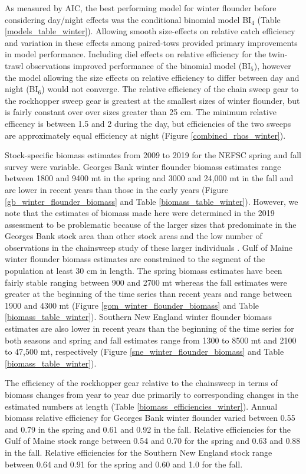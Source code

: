 \documentclass[]{article}
\begin{document}
As measured by AIC, the best performing model for winter flounder before
considering day/night effects was the conditional binomial model
BI\(_4\) (Table \ref{models_table_winter}). Allowing smooth size-effects
on relative catch efficiency and variation in these effects among
paired-tows provided primary improvements in model performance.
Including diel effects on relative efficiency for the twin-trawl
observations improved performance of the binomial model (BI\(_5\)),
however the model allowing the size effects on relative efficiency to
differ between day and night (BI\(_6\)) would not converge. The relative
efficiency of the chain sweep gear to the rockhopper sweep gear is
greatest at the smallest sizes of winter flounder, but is fairly
constant over over sizes greater than 25 cm. The minimum relative
efficency is between 1.5 and 2 during the day, but efficiencies of the
two sweeps are approximately equal efficiency at night (Figure
\ref{combined_rhos_winter}).

Stock-specific biomass estimates from 2009 to 2019 for the NEFSC spring
and fall survey were variable. Georges Bank winter flounder biomass
estimates range between 1800 and 9400 mt in the spring and 3000 and
24,000 mt in the fall and are lower in recent years than those in the
early years (Figure \ref{gb_winter_flounder_biomass} and Table
\ref{biomass_table_winter}). However, we note that the estimates of
biomass made here were determined in the 2019 assessment to be
problematic because of the larger sizes that predominate in the Georges
Bank stock area than other stock areas and the low number of
observations in the chainsweep study of these larger individuals
\citep{nefsc2020}. Gulf of Maine winter flounder biomass estimates are
constrained to the segment of the population at least 30 cm in length.
The spring biomass estimates have been fairly stable ranging between 900
and 2700 mt whereas the fall estimates were greater at the beginning of
the time series than recent years and range between 1900 and 4300 mt
(Figure \ref{gom_winter_flounder_biomass} and Table
\ref{biomass_table_winter}). Southern New England winter flounder
biomass estimates are also lower in recent years than the beginning of
the time series for both seasons and spring and fall estimates range
from 1300 to 8500 mt and 2100 to 47,500 mt, respectively (Figure
\ref{sne_winter_flounder_biomass} and Table \ref{biomass_table_winter}).

The efficiency of the rockhopper gear relative to the chainsweep in
terms of biomass changes from year to year due primarily to
corresponding changes in the estimated numbers at length (Table
\ref{biomass_efficiencies_winter}). Annual biomass relative efficiency
for Georges Bank winter flounder varied between 0.55 and 0.79 in the
spring and 0.61 and 0.92 in the fall. Relative efficiencies for the Gulf
of Maine stock range between 0.54 and 0.70 for the spring and 0.63 and
0.88 in the fall. Relative efficiencies for the Southern New England
stock range between 0.64 and 0.91 for the spring and 0.60 and 1.0 for
the fall.
\end{document}
